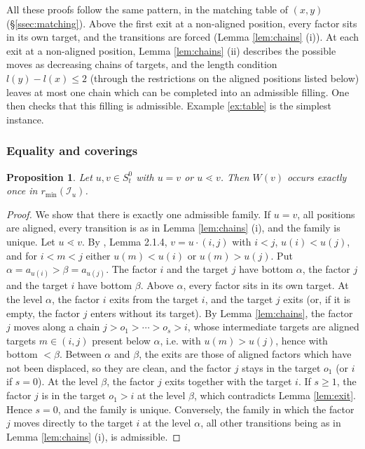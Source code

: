 \documentclass[a4paper,12pt,leqno]{amsart}
\newcommand{\caI}{\mathcal{I}}
\theoremstyle{plain}
\newtheorem{prop}[thm]{Proposition}
\theoremstyle{definition}
\theoremstyle{definition}
\begin{document}
All these proofs follow the same pattern, in the matching table of $(x,y)$
(\S\ref{ssec:matching}). Above the first exit at a non-aligned position, every factor sits in its own
target, and the transitions are forced (Lemma \ref{lem:chains} (i)). At each exit at a non-aligned
position, Lemma \ref{lem:chains} (ii) describes the possible moves as decreasing chains of targets,
and the length condition $l(y)-l(x)\leq2$ (through the restrictions on the aligned positions listed
below) leaves at most one chain which can be completed into an admissible filling. One then checks
that this filling is admissible. Example \ref{ex:table} is the simplest instance.


\subsubsection{Equality and coverings}

\begin{prop}\label{prop:twopos} Let $u,v\in S_t^0$ with $u=v$ or $u\lessdot v$. Then $W(v)$ occurs
exactly once in $r_{\min}(\caI_u)$.
\end{prop}

\begin{proof}
We show that there is exactly one admissible family. If $u=v$, all positions are aligned, every
transition is as in Lemma \ref{lem:chains} (i), and the family is unique. Let $u\lessdot v$. By
\cite{BB05}, Lemma 2.1.4, $v=u\cdot(i,j)$ with $i<j$, $u(i)<u(j)$, and for $i<m<j$ either
$u(m)<u(i)$ or $u(m)>u(j)$. Put $\alpha=a_{u(i)}>\beta=a_{u(j)}$. The factor $i$ and the target $j$
have bottom $\alpha$, the factor $j$ and the target $i$ have bottom $\beta$. Above $\alpha$, every
factor sits in its own target. At the level $\alpha$, the factor $i$ exits from the target $i$, and
the target $j$ exits (or, if it is empty, the factor $j$ enters without its target). By Lemma
\ref{lem:chains}, the factor $j$ moves along a chain $j>o_1>\cdots>o_s>i$, whose intermediate
targets are aligned targets $m\in(i,j)$ present below $\alpha$, i.e. with $u(m)>u(j)$, hence with
bottom $<\beta$. Between $\alpha$ and $\beta$, the exits are those of aligned factors which have
not been displaced, so they are clean, and the factor $j$ stays in the target $o_1$ (or $i$ if
$s=0$). At the level $\beta$, the factor $j$ exits together with the target $i$. If $s\geq1$, the
factor $j$ is in the target $o_1>i$ at the level $\beta$, which contradicts Lemma \ref{lem:exit}. Hence $s=0$, and
the family is unique. Conversely, the family in which the factor $j$ moves directly to the target
$i$ at the level $\alpha$, all other transitions being as in Lemma \ref{lem:chains} (i), is admissible.
\end{proof}
\end{document}
